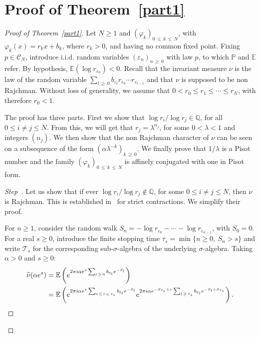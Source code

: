 \documentclass[AHL,Unicode,longabstracts,published]{cedram}
\newcommand{\Pbb}{\mathbb P}
\newcommand{\Ebb}{\mathbb E}
\newcommand{\Qbb}{\mathbb Q}
\newcommand{\Ccl}{\mathcal{C}}
\newcommand{\Tcl}{\mathcal{T}}
\newcounter{stepcount}
\newenvironment{step}{\refstepcounter{stepcount}\begin{proof}[Step~\thestepcount]}{\let\qed\relax\end{proof}}
\let\oldhat\hat
\renewcommand*{\hat}[1]{\mathchoice{\widehat{#1}}{\widehat{#1}}{\oldhat{#1}}{\oldhat{#1}}}
\begin{document}
\goodbreak

\section{Proof of Theorem~\ref{part1}}

\begin{proof}[{Proof of Theorem~\ref{part1}}]
Let $N\geq1$ and $(\varphi_k)_{0\,\leq\,k\,\leq\,N}$, with $\varphi_k(x)=r_kx+b_k$, where $r_k>0$, and having no common fixed point. Fixing $p\in {\Ccl}_N$, introduce i.i.d. random variables $(\varepsilon_n)_{n\,\geq\,0}$ with law $p$, to which $\Pbb$ and $\Ebb$ refer. By hypothesis, $\Ebb(\log r_{\varepsilon_0})<0$. Recall that the invariant measure $\nu$ is the law of the random variable $\sum_{l\,\geq\,0}b_{\varepsilon_l}r_{\varepsilon_0}\cdots r_{\varepsilon_{l-1}}$ and that $\nu$ is supposed to be non Rajchman. Without loss of generality, we assume that $0<r_0\leq r_1\leq\cdots\leq r_N$, with therefore $r_0<1$.

The proof has three parts. First we show that $\log r_i/\log r_j\in\Qbb$, for all $0\leq i\not=j\leq N$. From this, we will get that $r_j=\lambda^{n_j}$, for some $0<\lambda<1$ and integers $(n_j)$. We then show that the non Rajchman character of $\nu$ can be seen on a subsequence of the form $(\alpha\lambda^{-k})_{k\,\geq\,0}$. We finally prove that $1/\lambda$ is a Pisot number and the family $(\varphi_k)_{0\,\leq\,k\,\leq\,N}$ is affinely conjugated with one in Pisot form.


\begin{step}\label{step1}
Let us show that if ever $\log r_i/\log r_j\not\in\Qbb$, for some $0\leq i\not=j\leq N$, then $\nu$ is Rajchman. This is established in~\cite{lisa} for strict contractions. We simplify their proof.

For $n\geq1$, consider the random walk $S_n=-\log r_{\varepsilon_0}-\cdots-\log r_{\varepsilon_{n-1}}$, with $S_0=0$. For a real $s\geq0$, introduce the finite stopping time $\tau_s=\min\{n\geq0,~S_n>s\}$ and write ${\Tcl}_s$ for the corresponding sub-$\sigma$-algebra of the underlying $\sigma$-algebra. Taking $\alpha>0$ and $s\geq0$:
\begin{align*}
\hat{\nu}(\alpha e^s)&=\Ebb\left({e^{2\pi i\alpha e^s\sum_{l\,\geq\,0}b_{\varepsilon_l}e^{-S_l}}}\right)\\
&=\Ebb\left({e^{2\pi i\alpha e^{s}\sum_{0\,\leq\,l\,<\,\tau_s}b_{\varepsilon_l}e^{-S_l}}e^{2\pi i\alpha e^{-S_{\tau_s}+s}\sum_{l\,\geq\,\tau_s}b_{\varepsilon_l}e^{-S_l+S_{\tau_s}}}}\right).
\end{align*}



\end{step}
\end{proof}
\end{document}
